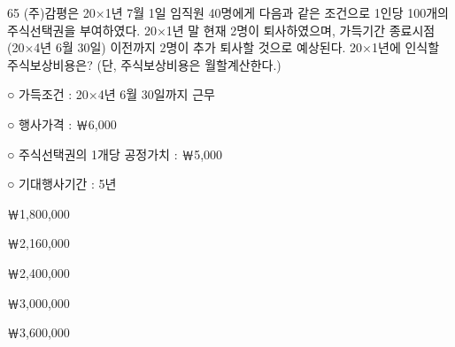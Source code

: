 \begin{question}{65}
(주)감평은 20×1년 7월 1일 임직원 40명에게 다음과 같은 조건으로 1인당 100개의 주식선택권을 부여하였다. 20×1년 말 현재 2명이 퇴사하였으며, 가득기간 종료시점(20×4년 6월 30일) 이전까지 2명이 추가 퇴사할 것으로 예상된다. 20×1년에 인식할 주식보상비용은? (단, 주식보상비용은 월할계산한다.)
\begin{framedtext}
○ 가득조건 : 20×4년 6월 30일까지 근무 \par
○ 행사가격 : ￦6,000 \par
○ 주식선택권의 1개당 공정가치 : ￦5,000 \par
○ 기대행사기간 : 5년
\end{framedtext}
\begin{choices}
  \item ￦1,800,000
  \item ￦2,160,000
  \item ￦2,400,000
  \item ￦3,000,000
  \item ￦3,600,000
\end{choices}
\end{question}
